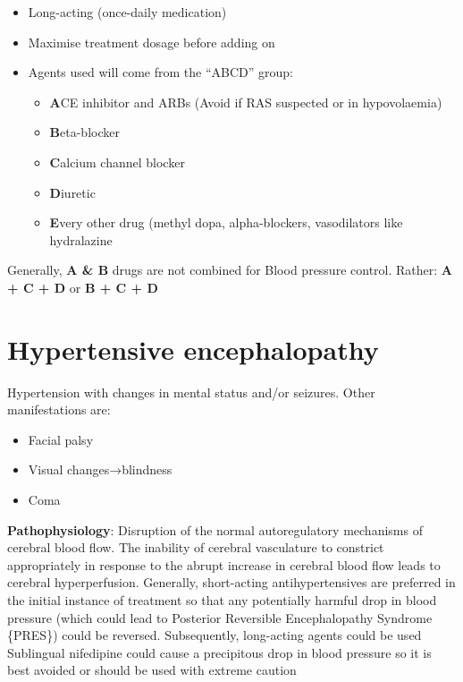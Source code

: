 \documentclass[
  letterpaper,
  DIV=11,
  numbers=noendperiod]{scrreprt}
\providecommand{\tightlist}{%
  \setlength{\itemsep}{0pt}\setlength{\parskip}{0pt}}\usepackage{longtable,booktabs,array}
\begin{document}
\begin{itemize}
\tightlist
\item
  Long-acting (once-daily medication)
\item
  Maximise treatment dosage before adding on
\item
  Agents used will come from the ``ABCD'' group:

  \begin{itemize}
  \tightlist
  \item
    \textbf{A}CE inhibitor and ARBs (Avoid if RAS suspected or in
    hypovolaemia)
  \item
    \textbf{B}eta-blocker
  \item
    \textbf{C}alcium channel blocker
  \item
    \textbf{D}iuretic
  \item
    \textbf{E}very other drug (methyl dopa, alpha-blockers, vasodilators
    like hydralazine
  \end{itemize}
\end{itemize}

Generally, \textbf{A \& B} drugs are not combined for Blood pressure
control. Rather: \textbf{A + C + D} or \textbf{B + C + D}

\hypertarget{hypertensive-encephalopathy}{%
\section{Hypertensive
encephalopathy}\label{hypertensive-encephalopathy}}

Hypertension with changes in mental status and/or seizures. Other
manifestations are:

\begin{itemize}
\tightlist
\item
  Facial palsy
\item
  Visual changes→blindness
\item
  Coma
\end{itemize}

\textbf{Pathophysiology}: Disruption of the normal autoregulatory
mechanisms of cerebral blood flow. The inability of cerebral vasculature
to constrict appropriately in response to the abrupt increase in
cerebral blood flow leads to cerebral hyperperfusion. Generally,
short-acting antihypertensives are preferred in the initial instance of
treatment so that any potentially harmful drop in blood pressure (which
could lead to Posterior Reversible Encephalopathy Syndrome \{PRES\})
could be reversed. Subsequently, long-acting agents could be used
Sublingual nifedipine could cause a precipitous drop in blood pressure
so it is best avoided or should be used with extreme caution
\end{document}
